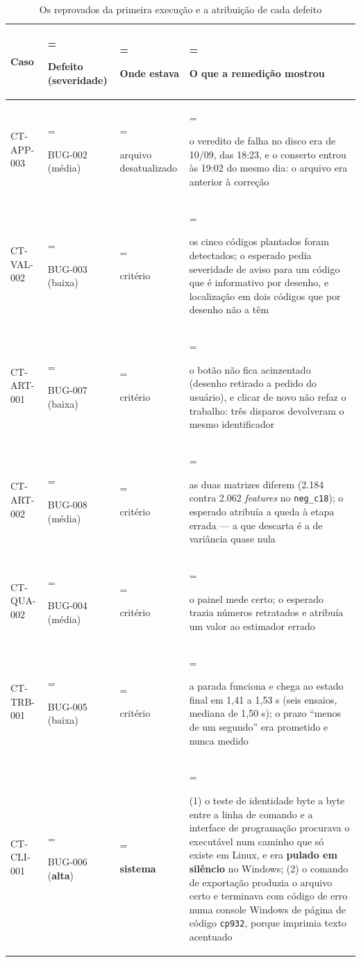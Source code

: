 \begin{table}[htbp]
\centering
\caption{Os reprovados da primeira execução e a atribuição de cada defeito}\label{tab:5-3}
\normalsize
\begin{tabularx}{\linewidth}{|l|>{\hsize=0.59\hsize\linewidth=\hsize\raggedright\arraybackslash\hspace{0pt}}X|>{\hsize=0.62\hsize\linewidth=\hsize\raggedright\arraybackslash\hspace{0pt}}X|>{\hsize=1.79\hsize\linewidth=\hsize\raggedright\arraybackslash\hspace{0pt}}X|}
\hline
\textbf{Caso} & \textbf{Defeito (severidade)} & \textbf{Onde estava} & \textbf{O que a remedição mostrou} \\
\hline
CT-APP-003 & BUG-002 (média) & arquivo desatualizado & o veredito de falha no disco era de 10/09, das 18:23, e o conserto entrou às 19:02 do mesmo dia: o arquivo era anterior à correção \\ \hline
CT-VAL-002 & BUG-003 (baixa) & critério & os cinco códigos plantados foram detectados; o esperado pedia severidade de aviso para um código que é informativo por desenho, e localização em dois códigos que por desenho não a têm \\ \hline
CT-ART-001 & BUG-007 (baixa) & critério & o botão não fica acinzentado (desenho retirado a pedido do usuário), e clicar de novo não refaz o trabalho: três disparos devolveram o mesmo identificador \\ \hline
CT-ART-002 & BUG-008 (média) & critério & as duas matrizes diferem (2.184 contra 2.062 \textit{features} no \texttt{neg\_\allowbreak{}c18}); o esperado atribuía a queda à etapa errada --- a que descarta é a de variância quase nula \\ \hline
CT-QUA-002 & BUG-004 (média) & critério & o painel mede certo; o esperado trazia números retratados e atribuía um valor ao estimador errado \\ \hline
CT-TRB-001 & BUG-005 (baixa) & critério & a parada funciona e chega ao estado final em 1,41 a 1,53 s (seis ensaios, mediana de 1,50 s); o prazo ``menos de um segundo'' era prometido e nunca medido \\ \hline
CT-CLI-001 & BUG-006 (\textbf{alta}) & \textbf{sistema} & (1) o teste de identidade byte a byte entre a linha de comando e a interface de programação procurava o executável num caminho que só existe em Linux, e era \textbf{pulado em silêncio} no Windows; (2) o comando de exportação produzia o arquivo certo e terminava com código de erro numa console Windows de página de código \texttt{cp932}, porque imprimia texto acentuado \\ \hline
\end{tabularx}
\end{table}

